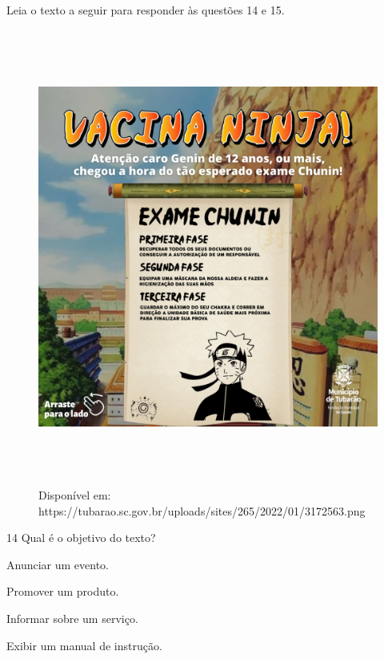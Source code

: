 


\pagebreak

\noindent Leia o texto a seguir para responder às questões 14 e 15.

\begin{figure}[H]
\centering\includegraphics[width=5.90556in,height=5.90556in]{./imgSAEB_6_POR/media/image51.png}
\caption{Disponível em: https://tubarao.sc.gov.br/uploads/sites/265/2022/01/3172563.png}
\end{figure}


\num{14} Qual é o objetivo do texto?

\begin{escolha}
\item
  Anunciar um evento.
\item
  Promover um produto.
\item
  Informar sobre um serviço.
\item
  Exibir um manual de instrução.
\end{escolha}


